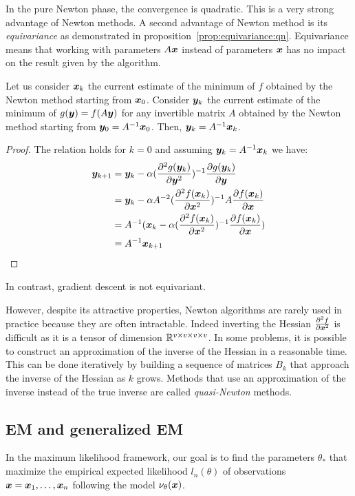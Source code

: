 In the pure Newton phase, the convergence is quadratic. This is a very strong
advantage of Newton methods.
A second advantage of Newton method is its \emph{equivariance} as demonstrated
in proposition~\ref{prop:equivariance:qn}. Equivariance means that working with
parameters $A \xb$ instead of parameters $\xb$ has no impact on the result given
by the algorithm.
\begin{prop}
  \label{prop:equivariance:qn}
  Let us consider $\xb_k$ the current estimate of the minimum of $f$ obtained by
  the Newton method starting from $\xb_0$.
  Consider $\yb_k$ the current estimate of the minimum of $g(\yb) = f(A\yb)$ for any
  invertible matrix $A$ obtained by the Newton method starting from $\yb_0 = A^{-1}\xb_0$.
  Then, $\yb_k = A^{-1} \xb_k$.
\end{prop}
\begin{proof}
  The relation holds for $k=0$ and assuming $\yb_k = A^{-1} \xb_k$ we have:
\begin{align}
  \yb_{k+1} &= \yb_k -\alpha (\partialfrac{\yb^2}{^2 g(\yb_k)})^{-1} \partialfrac{\yb}{g(\yb_k)} \\
  &= \yb_k -\alpha A^{-2}(\partialfrac{\xb^2}{^2 f(\xb_k)})^{-1} A \partialfrac{\xb}{f(\xb_k)} \\
  &= A^{-1} (\xb_k -\alpha (\partialfrac{\xb^2}{^2 f(\xb_k)})^{-1} \partialfrac{\xb}{f( \xb_k)}) \\
            &= A^{-1} \xb_{k+1} \\
\end{align}
\end{proof}
In contrast, gradient descent is not equivariant.

However, despite its attractive properties, Newton algorithms are rarely used in
practice because they are often intractable. Indeed inverting
the Hessian $\partialfrac{\xb^2}{^2 f}$ is difficult as it is a tensor of dimension $\RR^{v \times v \times v \times
  v}$.
In some problems, it is possible to construct an approximation of the inverse of
the Hessian in a reasonable time. This can be done iteratively by building a
sequence of matrices $B_k$ that approach the inverse of the Hessian as $k$ grows.
Methods that use an approximation of the inverse instead of the true inverse are
called \emph{quasi-Newton} methods. 

\subsection{EM and generalized EM}
In the maximum likelihood framework, our goal is to find the parameters
$\theta_*$ that maximize the empirical expected likelihood $l_n(\theta)$ of
observations $\xb = \xb_1, \dots, \xb_n$ following the model
$\nu_{\theta}(\xb)$.


